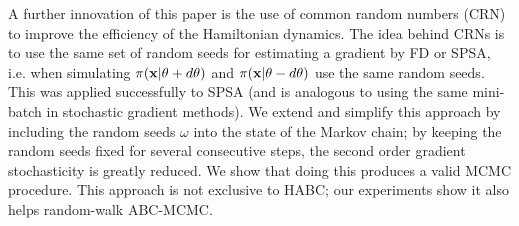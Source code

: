\documentclass[]{article}
\begin{document}



A further innovation of this paper is the use of common random numbers (CRN) to improve the efficiency of the Hamiltonian dynamics.  The idea behind CRNs is to use the same set of random seeds for estimating a gradient by FD or SPSA, i.e. when simulating $\pi({\bf x}| \theta + d\theta)$ and $\pi({\bf x}| \theta - d\theta)$ use the same random seeds.  This was applied successfully to SPSA \cite{kleinman1999simulation} (and is analogous to using the same mini-batch in stochastic gradient methods).  We extend and simplify this approach by including the random seeds $\omega$ into the state of the Markov chain;  by keeping the random seeds fixed for several consecutive steps, the second order gradient stochasticity is greatly reduced.  We show that doing this produces a valid MCMC procedure.  This approach is not exclusive to HABC; our experiments show it also helps random-walk ABC-MCMC.
\end{document}
